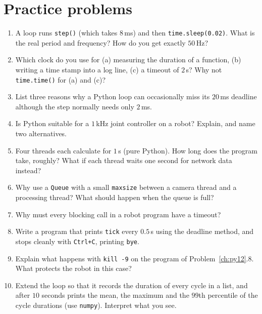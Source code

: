 \section*{Practice problems}
\begin{enumerate}[label=\textbf{\thechapter.\arabic*}]
  \item A loop runs \texttt{step()} (which takes $8$\,ms) and then \texttt{time.sleep(0.02)}. What is the real period and frequency? How do you get exactly $50$\,Hz?
  \item Which clock do you use for (a) measuring the duration of a function, (b) writing a time stamp into a log line, (c) a timeout of $2$\,s? Why not \texttt{time.time()} for (a) and (c)?
  \item List three reasons why a Python loop can occasionally miss its $20$\,ms deadline although the step normally needs only $2$\,ms.
  \item Is Python suitable for a $1$\,kHz joint controller on a robot? Explain, and name two alternatives.
  \item Four threads each calculate for $1$\,s (pure Python). How long does the program take, roughly? What if each thread waits one second for network data instead?
  \item Why use a \texttt{Queue} with a small \texttt{maxsize} between a camera thread and a processing thread? What should happen when the queue is full?
  \item Why must every blocking call in a robot program have a timeout?
  \item Write a program that prints \texttt{tick} every $0.5$\,s using the deadline method, and stops cleanly with \texttt{Ctrl+C}, printing \texttt{bye}.
  \item Explain what happens with \texttt{kill -9} on the program of Problem~\ref{ch:py12}.8. What protects the robot in this case?
  \item[\textbf{\thechapter.10}$\star$] Extend the loop so that it records the duration of every cycle in a list, and after $10$ seconds prints the mean, the maximum and the $99$th percentile of the cycle durations (use \texttt{numpy}). Interpret what you see.
\end{enumerate}
